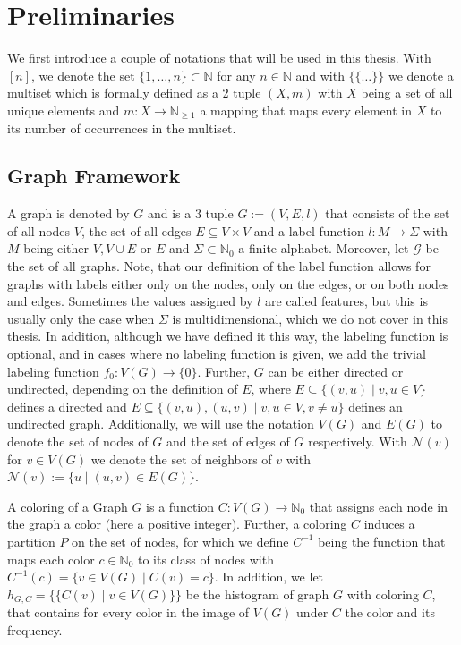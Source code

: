 \documentclass[11pt, dvipsnames, DIV=12]{scrreprt}
\theoremstyle{definition}
\newcommand{\MSopen}{\{\!\!\{}
\newcommand{\MSclose}{\}\!\!\}}
\begin{document}
\section{Preliminaries}
We first introduce a couple of notations that will be used in this thesis. With $[n]$, we denote the set $\{1, \ldots, n\} \subset \mathbb{N}$ for any $n \in \mathbb{N}$ and with $\MSopen \ldots \MSclose$ we denote a multiset which is formally defined as a 2 tuple $(X, m)$ with $X$ being a set of all unique elements and $m: X \rightarrow \mathbb{N}_{\geq 1}$ a mapping that maps every element in $X$ to its number of occurrences in the multiset.

\subsection{Graph Framework}
A graph is denoted by $G$ and is a 3 tuple $G:= (V, E, l)$ that consists of the set of all nodes $V$, the set of all edges $E \subseteq V \times V$ and a label function $l: M \rightarrow \Sigma$ with $M$ being either $V, V \cup E$ or $E$ and $\Sigma \subset \mathbb{N}_0$ a finite alphabet. Moreover, let $\mathcal{G}$ be the set of all graphs. Note, that our definition of the label function allows for graphs with labels either only on the nodes, only on the edges, or on both nodes and edges. Sometimes the values assigned by $l$ are called features, but this is usually only the case when $\Sigma$ is multidimensional, which we do not cover in this thesis. In addition, although we have defined it this way, the labeling function is optional, and in cases where no labeling function is given, we add the trivial labeling function $f_0: V(G) \rightarrow \{0\}$. Further, $G$ can be either directed or undirected, depending on the definition of $E$, where $E \subseteq \{(v,u) \mid v,u \in V\}$ defines a directed and $E \subseteq \{(v, u), (u,v) \mid v,u \in V, v\neq u\}$ defines an undirected graph. Additionally, we will use the notation $V(G)$ and $E(G)$ to denote the set of nodes of $G$ and the set of edges of $G$ respectively. With $\mathcal{N}(v)$ for $v \in V(G)$ we denote the set of neighbors of $v$ with $\mathcal{N}(v) := \{u \mid (u, v) \in E(G)\}$.

A coloring of a Graph $G$ is a function $C: V(G) \rightarrow \mathbb{N}_0$ that assigns each node in the graph a color (here a positive integer). Further, a coloring $C$ induces a partition $P$ on the set of nodes, for which we define $C^{-1}$ being the function that maps each color $c \in \mathbb{N}_0$ to its class of nodes with $C^{-1}(c) = \{ v\in V(G) \mid C(v) = c\}$. In addition, we let $h_{G, C} = \MSopen C(v) \mid v \in V(G) \MSclose$ be the histogram of graph $G$ with coloring $C$, that contains for every color in the image of $V(G)$ under $C$ the color and its frequency.
\end{document}

